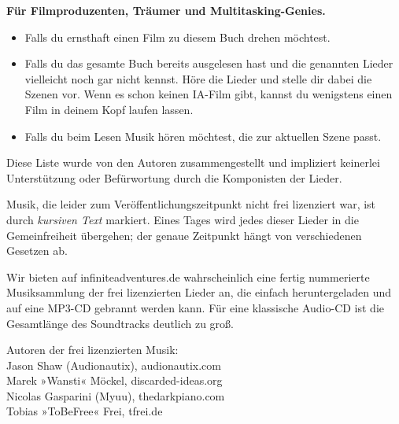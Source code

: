 \textbf{Für Filmproduzenten, Träumer und Multitasking-Genies.}

\begin{itemize}
    \item Falls du ernsthaft einen Film zu diesem Buch drehen möchtest.
    \item Falls du das gesamte Buch bereits ausgelesen hast und die genannten Lieder vielleicht noch gar nicht kennst. Höre die Lieder und stelle dir dabei die Szenen vor. Wenn es schon keinen IA-Film gibt, kannst du wenigstens einen Film in deinem Kopf laufen lassen.
    \item Falls du beim Lesen Musik hören möchtest, die zur aktuellen Szene passt.
\end{itemize}

Diese Liste wurde von den Autoren zusammengestellt und impliziert keinerlei Unterstützung oder Befürwortung durch die Komponisten der Lieder.

Musik, die leider zum Veröffentlichungszeitpunkt nicht frei lizenziert war, ist durch \textit{kursiven Text} markiert. Eines Tages wird jedes dieser Lieder in die Gemeinfreiheit übergehen; der genaue Zeitpunkt hängt von verschiedenen Gesetzen ab.

Wir bieten auf infiniteadventures.de wahrscheinlich eine fertig nummerierte Musiksammlung der frei lizenzierten Lieder an, die einfach heruntergeladen und auf eine MP3-CD gebrannt werden kann. Für eine klassische Audio-CD ist die Gesamtlänge des Soundtracks deutlich zu groß.

Autoren der frei lizenzierten Musik:\\
Jason Shaw (Audionautix), audionautix.com\\
Marek »Wansti« Möckel, discarded-ideas.org\\
Nicolas Gasparini (Myuu), thedarkpiano.com\\
Tobias »ToBeFree« Frei, tfrei.de

